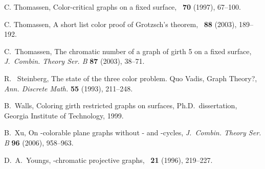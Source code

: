 \documentclass{article}
\begin{document}
\begin{thebibliography}{99}
 C. Thomassen, Color-critical graphs on a fixed surface,
\JCTB\ {\bf70} (1997), 67--100.

 C. Thomassen,
A short list color proof of Grotzsch's theorem,
\JCTB\ {\bf88} (2003), 189--192.

 C.~Thomassen,
The chromatic number of a graph of girth 5 on a fixed surface,
{\em J.~Combin. Theory Ser. B} {\bf 87} (2003), 38--71.

 R.~ Steinberg,
The state of the three color problem. Quo Vadis, Graph Theory?,
{\em Ann. Discrete Math.} {\bf 55} (1993), 211--248.

 B.~Walls, Coloring girth restricted graphs on surfaces,
Ph.D.\ dissertation, Georgia Institute of Technology, 1999.

 B.~Xu,
On -colorable plane graphs without - and -cycles, {\em J.~Combin. Theory Ser. B} {\bf 96} (2006), 958--963.

 D.~A.~Youngs, -chromatic projective graphs,
\JGT\ {\bf21} (1996), 219--227.

\end{thebibliography}
\end{document}
